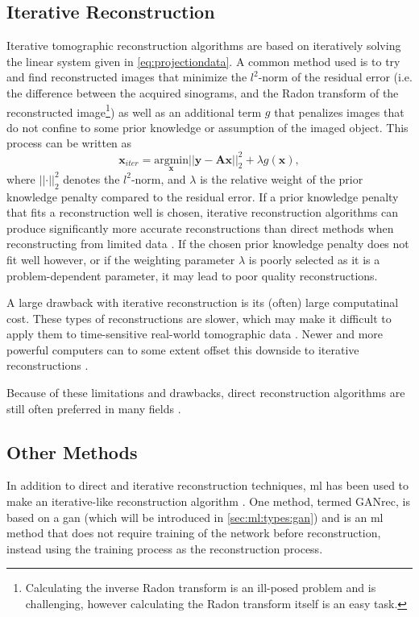 \subsection{Iterative Reconstruction}
Iterative tomographic reconstruction algorithms are based on iteratively solving the linear system given in \cref{eq:projectiondata}. A common method used is to try and find reconstructed images that minimize the $l^2$-norm of the residual error (i.e. the difference between the acquired sinograms, and the Radon transform of the reconstructed image\footnote{Calculating the inverse Radon transform is an ill-posed problem and is challenging, however calculating the Radon transform itself is an easy task. }) as well as an additional term $g$ that penalizes images that do not confine to some prior knowledge or assumption of the imaged object. This process can be written as \cite{jimaging4110128}
\begin{equation}
    \label{eq:iterativesolution}
    \bm{x}_{iter} = \underset{\bm{x}}{\text{argmin}} \left|\left|\bm{y} - \bm{A}\bm{x}\right|\right|_2^2 + \lambda g(\bm{x}),
\end{equation}
where $\left|\left| \bm{\cdot} \right|\right|_2^2$ denotes the $l^2$-norm, and $\lambda$ is the relative weight of the prior knowledge penalty compared to the residual error. If a prior knowledge penalty that fits a reconstruction well is chosen, iterative reconstruction algorithms can produce significantly more accurate reconstructions than direct methods when reconstructing from limited data \cite{jimaging4110128}. If the chosen prior knowledge penalty does not fit well however, or if the weighting parameter $\lambda$ is poorly selected as it is a problem-dependent parameter, it may lead to poor quality reconstructions. 

A large drawback with iterative reconstruction is its (often) large computatinal cost. These types of reconstructions are slower, which may make it difficult to apply them to time-sensitive real-world tomographic data \cite{jimaging4110128}. Newer and more powerful computers can to some extent offset this downside to iterative reconstructions \cite{willemink2013iterative}. 

Because of these limitations and drawbacks, direct reconstruction algorithms are still often preferred in many fields \cite{Pan_2009}. 


\subsection{Other Methods}
In addition to direct and iterative reconstruction techniques, \acrshort{ml} has been used to make an iterative-like reconstruction algorithm \cite{GANrec}. One method, termed GANrec, is based on a \acrshort{gan} (which will be introduced in \cref{sec:ml:types:gan}) and is an \acrshort{ml} method that does not require training of the network before reconstruction, instead using the training process as the reconstruction process. 

